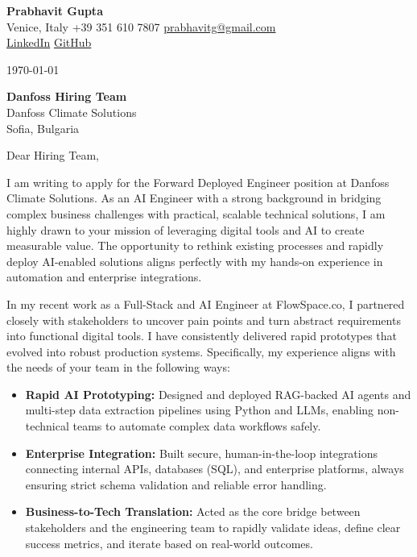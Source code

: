 \documentclass[11pt,a4paper]{article}
\begin{document}
\begin{center}
    {\Huge \textbf{Prabhavit Gupta}} \\
    \vspace{0.2cm}
    Venice, Italy \textbar{} +39 351 610 7807 \textbar{} \href{mailto:prabhavitg@gmail.com}{prabhavitg@gmail.com} \\
    \href{https://www.linkedin.com/in/prabhavit/}{LinkedIn} \textbar{} \href{https://github.com/prab-gupta}{GitHub}
\end{center}

\vspace{0.5cm}

\noindent \today

\vspace{0.5cm}

\noindent \textbf{Danfoss Hiring Team} \\
Danfoss Climate Solutions \\
Sofia, Bulgaria

\vspace{0.5cm}

\noindent Dear Hiring Team,

\vspace{0.3cm}

\noindent I am writing to apply for the Forward Deployed Engineer position at Danfoss Climate Solutions. As an AI Engineer with a strong background in bridging complex business challenges with practical, scalable technical solutions, I am highly drawn to your mission of leveraging digital tools and AI to create measurable value. The opportunity to rethink existing processes and rapidly deploy AI-enabled solutions aligns perfectly with my hands-on experience in automation and enterprise integrations.

\vspace{0.3cm}

\noindent In my recent work as a Full-Stack and AI Engineer at FlowSpace.co, I partnered closely with stakeholders to uncover pain points and turn abstract requirements into functional digital tools. I have consistently delivered rapid prototypes that evolved into robust production systems. Specifically, my experience aligns with the needs of your team in the following ways:

\begin{itemize}
    \item \textbf{Rapid AI Prototyping:} Designed and deployed RAG-backed AI agents and multi-step data extraction pipelines using Python and LLMs, enabling non-technical teams to automate complex data workflows safely.
    \item \textbf{Enterprise Integration:} Built secure, human-in-the-loop integrations connecting internal APIs, databases (SQL), and enterprise platforms, always ensuring strict schema validation and reliable error handling.
    \item \textbf{Business-to-Tech Translation:} Acted as the core bridge between stakeholders and the engineering team to rapidly validate ideas, define clear success metrics, and iterate based on real-world outcomes.
\end{itemize}
\end{document}
